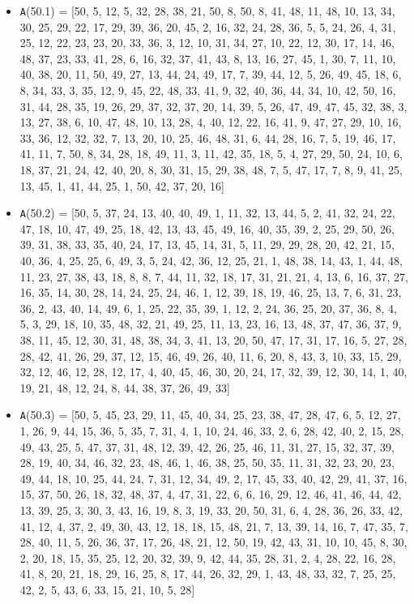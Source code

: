 \documentclass[runningheads, a4paper]{llncs}
\begin{document}
\begin{itemize}
	\item {\texttt A(50.1) = } [50, 5, 12, 5, 32, 28, 38, 21, 50, 8, 50, 8, 41, 48, 11, 48, 10, 13, 34, 30, 25, 29, 22, 17, 29, 39, 36, 20, 45, 2, 16, 32, 24, 28, 36, 5, 5, 24, 26, 4, 31, 25, 12, 22, 23, 23, 20, 33, 36, 3, 12, 10, 31, 34, 27, 10, 22, 12, 30, 17, 14, 46, 48, 37, 23, 33, 41, 28, 6, 16, 32, 37, 41, 43, 8, 13, 16, 27, 45, 1, 30, 7, 11, 10, 40, 38, 20, 11, 50, 49, 27, 13, 44, 24, 49, 17, 7, 39, 44, 12, 5, 26, 49, 45, 18, 6, 8, 34, 33, 3, 35, 12, 9, 45, 22, 48, 33, 41, 9, 32, 40, 36, 44, 34, 10, 42, 50, 16, 31, 44, 28, 35, 19, 26, 29, 37, 32, 37, 20, 14, 39, 5, 26, 47, 49, 47, 45, 32, 38, 3, 13, 27, 38, 6, 10, 47, 48, 10, 13, 28, 4, 40, 12, 22, 16, 41, 9, 47, 27, 29, 10, 16, 33, 36, 12, 32, 32, 7, 13, 20, 10, 25, 46, 48, 31, 6, 44, 28, 16, 7, 5, 19, 46, 17, 41, 11, 7, 50, 8, 34, 28, 18, 49, 11, 3, 11, 42, 35, 18, 5, 4, 27, 29, 50, 24, 10, 6, 18, 37, 21, 24, 42, 40, 20, 8, 30, 31, 15, 29, 38, 48, 7, 5, 47, 17, 7, 8, 9, 41, 25, 13, 45, 1, 41, 44, 25, 1, 50, 42, 37, 20, 16]
	\item {\texttt A(50.2) = } [50, 5, 37, 24, 13, 40, 40, 49, 1, 11, 32, 13, 44, 5, 2, 41, 32, 24, 22, 47, 18, 10, 47, 49, 25, 18, 42, 13, 43, 45, 49, 16, 40, 35, 39, 2, 25, 29, 50, 26, 39, 31, 38, 33, 35, 40, 24, 17, 13, 45, 14, 31, 5, 11, 29, 29, 28, 20, 42, 21, 15, 40, 36, 4, 25, 25, 6, 49, 3, 5, 24, 42, 36, 12, 25, 21, 1, 48, 38, 14, 43, 1, 44, 48, 11, 23, 27, 38, 43, 18, 8, 8, 7, 44, 11, 32, 18, 17, 31, 21, 21, 4, 13, 6, 16, 37, 27, 16, 35, 14, 30, 28, 14, 24, 25, 24, 46, 1, 12, 39, 18, 19, 46, 25, 13, 7, 6, 31, 23, 36, 2, 43, 40, 14, 49, 6, 1, 25, 22, 35, 39, 1, 12, 2, 24, 36, 25, 20, 37, 36, 8, 4, 5, 3, 29, 18, 10, 35, 48, 32, 21, 49, 25, 11, 13, 23, 16, 13, 48, 37, 47, 36, 37, 9, 38, 11, 45, 12, 30, 31, 48, 38, 34, 3, 41, 13, 20, 50, 47, 17, 31, 17, 16, 5, 27, 28, 28, 42, 41, 26, 29, 37, 12, 15, 46, 49, 26, 40, 11, 6, 20, 8, 43, 3, 10, 33, 15, 29, 32, 12, 46, 12, 28, 12, 17, 4, 40, 45, 46, 30, 20, 24, 17, 32, 39, 12, 30, 14, 1, 40, 19, 21, 48, 12, 24, 8, 44, 38, 37, 26, 49, 33]
	\item {\texttt A(50.3) = } [50, 5, 45, 23, 29, 11, 45, 40, 34, 25, 23, 38, 47, 28, 47, 6, 5, 12, 27, 1, 26, 9, 44, 15, 36, 5, 35, 7, 31, 4, 1, 10, 24, 46, 33, 2, 6, 28, 42, 40, 2, 15, 28, 49, 43, 25, 5, 47, 37, 31, 48, 12, 39, 42, 26, 25, 46, 11, 31, 27, 15, 32, 37, 39, 28, 19, 40, 34, 46, 32, 23, 48, 46, 1, 46, 38, 25, 50, 35, 11, 31, 32, 23, 20, 23, 49, 44, 18, 10, 25, 44, 24, 7, 31, 12, 34, 49, 2, 17, 45, 33, 40, 42, 29, 41, 37, 16, 15, 37, 50, 26, 18, 32, 48, 37, 4, 47, 31, 22, 6, 6, 16, 29, 12, 46, 41, 46, 44, 42, 13, 39, 25, 3, 30, 3, 43, 16, 19, 8, 3, 19, 33, 20, 50, 31, 6, 4, 28, 36, 26, 33, 42, 41, 12, 4, 37, 2, 49, 30, 43, 12, 18, 18, 15, 48, 21, 7, 13, 39, 14, 16, 7, 47, 35, 7, 28, 40, 11, 5, 26, 36, 37, 17, 26, 48, 21, 12, 50, 19, 42, 43, 31, 10, 10, 45, 8, 30, 2, 20, 18, 15, 35, 25, 12, 20, 32, 39, 9, 42, 44, 35, 28, 31, 2, 4, 28, 22, 16, 28, 41, 8, 20, 21, 18, 29, 16, 25, 8, 17, 44, 26, 32, 29, 1, 43, 48, 33, 32, 7, 25, 25, 42, 2, 5, 43, 6, 33, 15, 21, 10, 5, 28]

\end{itemize}
\end{document}
